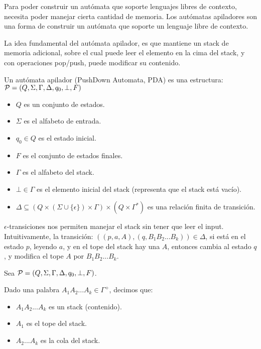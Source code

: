 \documentclass[a4paper,twoside,master.tex]{article}
\begin{document}

Para poder construir un autómata que soporte lenguajes libres de contexto, necesita poder manejar cierta cantidad de memoria. Los autómatas apiladores son una forma de construir un autómata que soporte un lenguaje libre de contexto.

La idea fundamental del autómata apilador, es que mantiene un stack de memoria adicional, sobre el cual puede leer el elemento en la cima del stack, y con operaciones pop/push, puede modificar su contenido.


\begin{definicion}
    Un autómata apilador (PushDown Automata, PDA) es una estructura: $\mathcal{P} = (Q, \Sigma, \Gamma, \Delta, q_0, \bot, F)$
    \begin{itemize}
        \item $Q$ es un conjunto de estados.
        \item $\Sigma$ es el alfabeto de entrada.
        \item $q_0 \in Q$ es el estado inicial.
        \item $F$ es el conjunto de estados finales.
        \item $\Gamma$ es el alfabeto del stack.
        \item $\bot \in \Gamma$ es el elemento inicial del stack (representa que el stack está vacío).
        \item $\Delta \subseteq (Q \times (\Sigma \cup \{\epsilon\}) \times \Gamma) \times (Q \times \Gamma^*)$ es una relación finita de transición.
    \end{itemize}
\end{definicion}

$\epsilon$-transiciones nos permiten manejar el stack sin tener que leer el input. Intuitivamente, la transición: $((p, a, A), (q, B_1B_2...B_k)) \in \Delta$, si está en el estado $p$, leyendo $a$, y en el tope del stack hay una $A$, entonces cambia al estado $q$, y modifica el tope $A$ por $B_1B_2...B_k$.

Sea $\mathcal{P} = (Q, \Sigma, \Gamma, \Delta, q_0, \bot, F)$.

\begin{notacion}
    Dado una palabra $A_1A_2...A_k \in \Gamma^+$, decimos que:
    \begin{itemize}
        \item $A_1A_2...A_k$ es un stack (contenido).
        \item $A_1$ es el tope del stack.
        \item $A_2...A_k$ es la cola del stack.
    \end{itemize}
\end{notacion}
\end{document}
